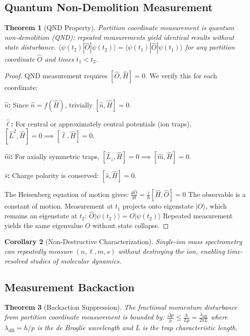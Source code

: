 \documentclass[twocolumn,10pt]{article}
\newtheorem{theorem}{Theorem}[section]
\newtheorem{corollary}[theorem]{Corollary}
\begin{document}
\subsection{Quantum Non-Demolition Measurement}

\begin{theorem}[QND Property]
\label{thm:qnd}
Partition coordinate measurement is quantum non-demolition (QND): repeated measurements yield identical results without state disturbance.
$
\langle \psi(t_2) | \hat{O} | \psi(t_2) \rangle = \langle \psi(t_1) | \hat{O} | \psi(t_1) \rangle
$
for any partition coordinate $\hat{O}$ and times $t_1 < t_2$.
\end{theorem}

\begin{proof}
QND measurement requires $[\hat{O}, \hat{H}] = 0$. We verify this for each coordinate:

\textbf{$\hat{n}$:} Since $\hat{n} = f(\hat{H})$, trivially $[\hat{n}, \hat{H}] = 0$.

\textbf{$\hat{\ell}$:} For central or approximately central potentials (ion traps), $[\hat{L}^2, \hat{H}] = 0 \implies [\hat{\ell}, \hat{H}] = 0$.

\textbf{$\hat{m}$:} For axially symmetric traps, $[\hat{L}_z, \hat{H}] = 0 \implies [\hat{m}, \hat{H}] = 0$.

\textbf{$\hat{s}$:} Charge polarity is conserved: $[\hat{s}, \hat{H}] = 0$.

The Heisenberg equation of motion gives:
$
\frac{d\hat{O}}{dt} = \frac{i}{\hbar}[\hat{H}, \hat{O}] = 0
$
The observable is a constant of motion. Measurement at $t_1$ projects onto eigenstate $|O\rangle$, which remains an eigenstate at $t_2$:
$
\hat{O}|\psi(t_2)\rangle = O|\psi(t_2)\rangle
$
Repeated measurement yields the same eigenvalue $O$ without state collapse.
\end{proof}

\begin{corollary}[Non-Destructive Characterization]
\label{cor:nondestructive}
Single-ion mass spectrometry can repeatedly measure $(n, \ell, m, s)$ without destroying the ion, enabling time-resolved studies of molecular dynamics.
\end{corollary}

\subsection{Measurement Backaction}

\begin{theorem}[Backaction Suppression]
\label{thm:backaction}
The fractional momentum disturbance from partition coordinate measurement is bounded by:
$
\frac{\Delta p}{p} \leq \frac{\hbar}{Lp} = \frac{\lambda_{\mathrm{dB}}}{2\pi L}
$
where $\lambda_{\mathrm{dB}} = h/p$ is the de Broglie wavelength and $L$ is the trap characteristic length.
\end{theorem}
\end{document}
